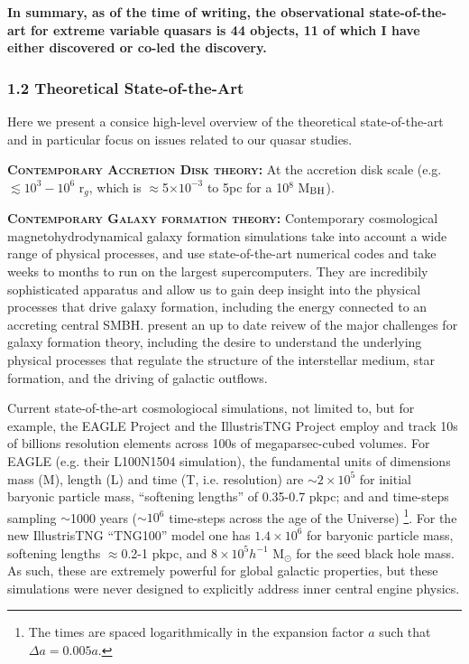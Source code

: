 \smallskip
\smallskip
\noindent
{\bf In summary, as of the time of writing, the
observational state-of-the-art for extreme variable quasars is 44
objects, 11 of which I have either discovered or co-led the
discovery.}




\subsubsection*{1.2 Theoretical State-of-the-Art}
Here we present a consice high-level overview of the theoretical state-of-the-art 
and in particular focus on issues related to our quasar studies. 

\smallskip
\smallskip
\noindent
\textbf{\textsc{Contemporary Accretion Disk theory:}}
At the accretion disk scale (e.g. $\lesssim 10^{3}-10^{6}$ r$_{g}$,
which is $\approx$5$\times$$10^{-3}$ to 5pc for a 10$^{8}$ M$_{\rm
BH}$).
%
\citet{JiangYF2014, JiangYF2016} 


\smallskip
\smallskip
\noindent
\textbf{\textsc{Contemporary Galaxy formation theory:}}
Contemporary cosmological magnetohydrodynamical galaxy formation
simulations take into account a wide range of physical processes, and
use state-of-the-art numerical codes and take weeks to months to run
on the largest supercomputers.  They are incredibily sophisticated
apparatus and allow us to gain deep insight into the physical
processes that drive galaxy formation, including the energy connected
to an accreting central SMBH. \citet{NaabOstriker2017} present an up
to date reivew of the major challenges for galaxy formation theory, 
including the desire to understand the underlying physical processes
that regulate the structure of the interstellar medium, star
formation, and the driving of galactic outflows.

\smallskip
\smallskip
\noindent
Current state-of-the-art cosmologiocal simulations, not limited to, 
but for example, the EAGLE Project \citep{Schaye2015, Crain2015} and
the IllustrisTNG Project \citep{Pillepich2018} employ and track 10s of
billions resolution elements across 100s of megaparsec-cubed volumes.
For EAGLE (e.g. their L100N1504 simulation), the fundamental units of dimensions 
mass (M), length (L) and time (T, i.e. resolution) are
$\sim2\times10^{5}$ for initial baryonic particle mass, 
``softening lengths'' of 0.35-0.7 pkpc; and and time-steps sampling $\sim$1000 years 
($\sim10^{6}$ time-steps across the age of the Universe) 
\footnote{The times are spaced logarithmically in the expansion factor $a$ such that  $\Delta a = 0.005a$.}. 
For the new IllustrisTNG ``TNG100'' model one has
$1.4\times10^{6}$ for baryonic particle mass, 
softening lengths $\approx$0.2-1 pkpc, and $8\times10^{5} h^{-1}$ M$_{\odot}$ for the seed black hole mass. 
As such, these are extremely powerful for global galactic properties, but these simulations were 
never designed to explicitly address inner central engine physics. 

